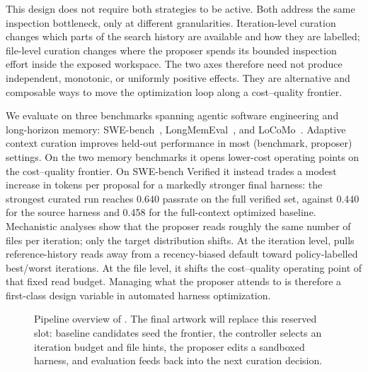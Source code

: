 This design does not require both strategies to be active. Both
address the same inspection bottleneck, only at different granularities.
Iteration-level curation changes which parts of the search history are
available and how they are labelled; file-level curation changes where
the proposer spends its bounded inspection effort inside the exposed
workspace. The two axes therefore need not produce independent,
monotonic, or uniformly positive effects. They are alternative and
composable ways to move the optimization loop along a cost--quality
frontier.

We evaluate \name on three benchmarks spanning agentic software
engineering and long-horizon memory: SWE-bench~\cite{jimenez2024swebench},
LongMemEval~\cite{wu2024longmemeval}, and LoCoMo~\cite{maharana2024locomo}.
Adaptive context curation improves held-out performance in most
(benchmark, proposer) settings. On the two memory benchmarks it opens
lower-cost operating points on the cost--quality frontier. On
SWE-bench Verified it instead trades a modest increase in tokens per
proposal for a markedly stronger final harness: the strongest curated
run reaches 0.640 passrate on the full verified set, against 0.440 for
the source harness and 0.458 for the full-context optimized baseline.
Mechanistic analyses show that the proposer reads roughly the same
number of files per iteration; only the target distribution shifts.
At the iteration level, \name pulls reference-history reads away from
a recency-biased default toward policy-labelled best/worst iterations.
At the file level, it shifts the cost--quality operating point of that
fixed read budget. Managing what the proposer attends to is therefore
a first-class design variable in automated harness optimization.

\begin{figure}[t]
  \centering
  \fbox{\rule{0pt}{1.45in}\rule{0.94\textwidth}{0pt}}
  \vspace{-4pt}
  \caption{Pipeline overview of \name. The final artwork will replace
  this reserved slot: baseline candidates seed the frontier, the
  controller selects an iteration budget and file hints, the proposer
  edits a sandboxed harness, and evaluation feeds back into the next
  curation decision.}
  \label{fig:pipeline}
\end{figure}
